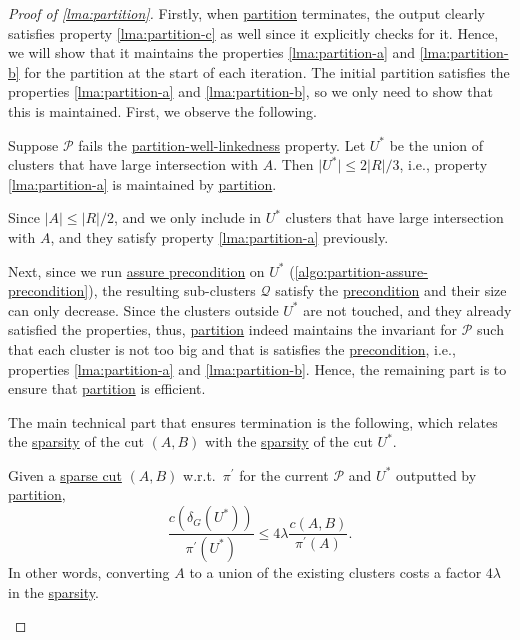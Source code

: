 \begin{proof}[Proof of \autoref{lma:partition}]
	Firstly, when \hyperref[algo:partition]{partition} terminates, the output clearly satisfies property \autoref{lma:partition-c} as well since it explicitly checks for it. Hence, we will show that it maintains the properties \autoref{lma:partition-a} and \autoref{lma:partition-b} for the partition at the start of each iteration. The initial partition satisfies the properties \autoref{lma:partition-a} and \autoref{lma:partition-b}, so we only need to show that this is maintained. First, we observe the following.

	\begin{claim}
		Suppose \(\mathcal{P} \) fails the \hyperref[def:partition-and-boundary-well-linked]{partition-well-linkedness} property. Let \(U^{\ast} \) be the union of clusters that have large intersection with \(A\). Then \(\lvert U^{\ast} \rvert \leq 2 \lvert R \rvert / 3\), i.e., property \autoref{lma:partition-a} is maintained by \hyperref[algo:partition]{partition}.
	\end{claim}
	\begin{explanation}
		Since \(\lvert A \rvert \leq \lvert R \rvert / 2\), and we only include in \(U^{\ast} \) clusters that have large intersection with \(A\), and they satisfy property \autoref{lma:partition-a} previously.
	\end{explanation}
	Next, since we run \hyperref[algo:assure-precondition]{assure precondition} on \(U^{\ast} \) (\autoref{algo:partition-assure-precondition}), the resulting sub-clusters \(\mathcal{Q} \) satisfy the \hyperref[def:precondition]{precondition} and their size can only decrease. Since the clusters outside \(U^{\ast} \) are not touched, and they already satisfied the properties, thus, \hyperref[algo:partition]{partition} indeed maintains the invariant for \(\mathcal{P} \) such that each cluster is not too big and that is satisfies the \hyperref[def:precondition]{precondition}, i.e., properties \autoref{lma:partition-a} and \autoref{lma:partition-b}. Hence, the remaining part is to ensure that \hyperref[algo:partition]{partition} is efficient.

	The main technical part that ensures termination is the following, which relates the \hyperref[def:sparsity]{sparsity} of the cut \((A, B)\) with the \hyperref[def:sparsity]{sparsity} of the cut \(U^{\ast} \).

	\begin{claim}
		Given a \hyperref[prb:non-uniform-sparsest-cut]{sparse cut} \((A, B)\) w.r.t.\ \(\pi ^{\prime} \) for the current \(\mathcal{P} \) and \(U^{\ast} \) outputted by \hyperref[algo:partition]{partition},
		\[
			\frac{c(\delta _G(U^{\ast} ))}{\pi ^{\prime} (U^{\ast} )}
			\leq 4 \lambda \frac{c(A, B)}{\pi ^{\prime} (A)}.
		\]
		In other words, converting \(A\) to a union of the existing clusters costs a factor \(4 \lambda \) in the \hyperref[def:sparsity]{sparsity}.
	\end{claim}
	\begin{explanation}
	\end{explanation}


\end{proof}
